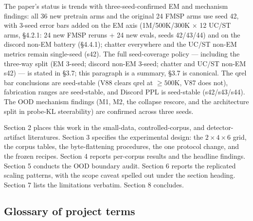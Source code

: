 \documentclass[11pt]{article}
\begin{document}
The paper's status is trends with three-seed-confirmed EM and mechanism findings: all 36 new pretrain arms and the original 24 FMSP arms use seed 42, with 3-seed error bars added on the EM axis (1M/500K/300K $\times$ 12 UC/ST arms, \S4.2.1: 24 new FMSP reruns + 24 new evals, seeds 42/43/44) and on the discord non-EM battery (\S4.4.1); chatter everywhere and the UC/ST non-EM metrics remain single-seed (s42). The full seed-coverage policy --- including the three-way split (EM 3-seed; discord non-EM 3-seed; chatter and UC/ST non-EM s42) --- is stated in \S3.7; this paragraph is a summary, \S3.7 is canonical. The qrel bar conclusions are seed-stable (V88 clears qrel at $\geq 500$K, V87 does not), fabrication ranges are seed-stable, and Discord PPL is seed-stable (s42/s43/s44). The OOD mechanism findings (M1, M2, the collapse rescore, and the architecture split in probe-KL steerability) are confirmed across three seeds.

Section 2 places this work in the small-data, controlled-corpus, and detector-artifact literatures. Section 3 specifies the experimental design: the $2 \times 4 \times 6$ grid, the corpus tables, the byte-flattening procedures, the one protocol change, and the frozen recipes. Section 4 reports per-corpus results and the headline findings. Section 5 conducts the OOD boundary audit. Section 6 reports the replicated scaling patterns, with the scope caveat spelled out under the section heading. Section 7 lists the limitations verbatim. Section 8 concludes.

\subsection{Glossary of project terms}
\end{document}
